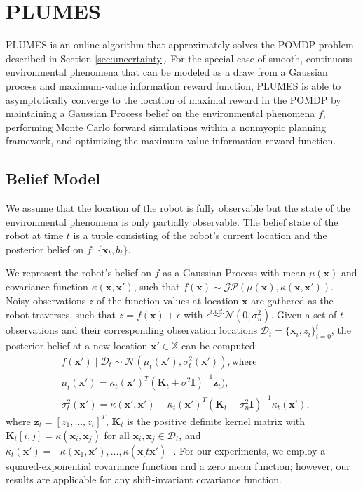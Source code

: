 \documentclass{styles/svproc}
\newcommand{\x}{\mathbf{x}}
\begin{document}
\section{PLUMES}
\label{sec:model}

PLUMES is an online algorithm that approximately solves the POMDP problem described in Section \ref{sec:uncertainty}. For the special case of smooth, continuous environmental phenomena that can be modeled as a draw from a Gaussian process and maximum-value information reward function, PLUMES is able to asymptotically converge to the location of maximal reward in the POMDP by maintaining a Gaussian Process belief on the environmental phenomena $f$, performing Monte Carlo forward simulations within a nonmyopic planning framework, and optimizing the maximum-value information reward function.

\subsection{Belief Model}
\label{sec:gp}
We assume that the location of the robot is fully observable but the state of the environmental phenomena is only partially observable. The belief state of the robot at time $t$ is a tuple consisting of the robot's current location and the posterior belief on $f$: $\{\x_t, b_t\}$. 

We represent the robot's belief on $f$ as a Gaussian Process with mean $\mu(\mathbf{x})$ and covariance function $\kappa(\mathbf{x}, \mathbf{x}')$, such that $f(\mathbf{x}) \sim \mathcal{GP}(\mu(\mathbf{x}), \kappa(\mathbf{x}, \mathbf{x}'))$. Noisy observations $z$ of the function values at location $\mathbf{x}$ are gathered as the robot traverses, such that $z = f(\mathbf{x}) + \epsilon$ with $\epsilon \stackrel{i.i.d.}{\sim} \mathcal{N}(0, \sigma_n^2)$. Given a set of $t$ observations and their corresponding observation locations $\mathcal{D}_t = \{\mathbf{x}_i, z_i\}_{i = 0}^t$, the posterior belief at a new location $\mathbf{x}' \in \mathbb{X}$ can be computed: 
\begin{align}
    &f(\x') \mid {\mathcal{D}_t} \sim \mathcal{N}(\mu_{t}(\x'), \sigma_{t}^2(\x')), \text {where} \\
    &\mu_{t}(\x') = \kappa_t(\x')^T(\mathbf{K}_t + \sigma^2\mathbf{I})^{-1} \mathbf{z}_t),    \label{eq:gp_mean} \\
    &\sigma_t^2(\x') = \kappa(\x', \x') - \kappa_t(\x')^T(\mathbf{K}_t + \sigma_n^2\mathbf{I})^{-1}\kappa_t(\x'), \label{eq:gp_var}
\end{align}
where $\mathbf{z}_t = [z_1, \dots, z_t]^T$, $\mathbf{K}_t$ is the positive definite kernel matrix with $\mathbf{K}_t[i, j] = \kappa(\x_i, \x_j)$ for all $\x_i, \x_j \in \mathcal{D}_t$, and $\kappa_t(\x') = [\kappa(\x_1, \x'), \dots, \kappa(\x_,t \x')]$. For our experiments, we employ a squared-exponential covariance function \cite{Rasmussen2004} and a zero mean function; however, our results are applicable for any shift-invariant covariance function. 
\end{document}
